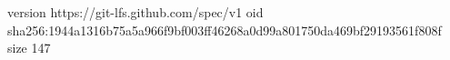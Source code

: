 version https://git-lfs.github.com/spec/v1
oid sha256:1944a1316b75a5a966f9bf003ff46268a0d99a801750da469bf29193561f808f
size 147
